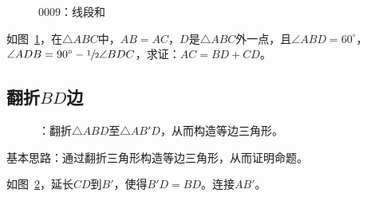 

\begin{figure}[htbp]
  \centering
  \caption{0009：线段和} \label{fig:0009}
\end{figure}

如图~\ref{fig:0009}，在$\triangle ABC$中，$AB = AC$，$D$是$\triangle ABC$外一点，且$\angle ABD = 60^\circ$，$\angle ADB = 90^\circ - \sfrac12\angle BDC$，求证：$AC = BD + CD$。

\subsection{翻折$BD$边} \label{subsec:0009-BD}

\begin{figure}[htbp]
  \centering
  \caption{：翻折$\triangle ABD$至$\triangle AB'D$，从而构造等边三角形。}
  \label{fig:0009-BD}
\end{figure}

基本思路：通过翻折三角形构造等边三角形，从而证明命题。

如图~\ref{fig:0009-BD}，延长$CD$到$B'$，使得$B'D = BD$。连接$AB'$。


